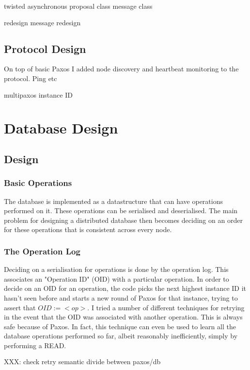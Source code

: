 \documentclass[12pt,twoside,notitlepage]{report}
\begin{document}
twisted asynchronous
proposal class
message class

redesign
message redesign

\subsection{Protocol Design}

On top of basic Paxos I added node discovery and heartbeat monitoring to the protocol. 
Ping etc

multipaxos
instance ID


\section{Database Design}

\subsection{Design}

\subsubsection{Basic Operations}

The database is implemented as a datastructure that can have operations performed on it. These
operations can be serialised and deserialised. The main problem for designing a distributed
database then becomes deciding on an order for these operations that is consistent across every
node.

\subsubsection{The Operation Log}

Deciding on a serialisation for operations is done by the operation log. This associates an
"Operation ID" (OID) with a particular operation. In order to decide on an OID for an operation,
the code picks the next highest instance ID it hasn't seen before and starts a new round of Paxos
for that instance, trying to assert that $OID := <op>$. I tried a number of different
techniques for retrying in the event that the OID was associated with another operation. This is
always safe because of Paxos. In fact, this technique can even be used to learn all the database
operations performed so far, albeit reasonably inefficiently, simply by performing a READ.

XXX: check retry semantic divide between paxos/db
\end{document}
